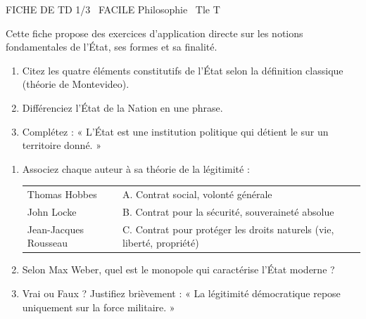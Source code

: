 \documentclass[11pt]{article}
\begin{document}
\begin{tcolorbox}[enhanced,colback=popink,colframe=popink,arc=10pt,boxrule=0pt,left=12pt,right=12pt,top=9pt,bottom=9pt]
{\color{white}\popxbold\small FICHE DE TD 1/3 \textbullet\ FACILE \hfill Philosophie \textbullet\ Tle T\par}
\end{tcolorbox}
\vspace{4pt}
Cette fiche propose des exercices d'application directe sur les notions fondamentales de l'État, ses formes et sa finalité.

\begin{exercice}
\begin{enumerate}
    \item Citez les quatre éléments constitutifs de l'État selon la définition classique (théorie de Montevideo).
    \item Différenciez l'État de la Nation en une phrase.
    \item Complétez : « L'État est une institution politique qui détient le \underline{\hspace{4cm}} sur un territoire donné. »
\end{enumerate}
\end{exercice}

\begin{exercice}
\begin{enumerate}
    \item Associez chaque auteur à sa théorie de la légitimité :
    \begin{tabular}{ll}
        Thomas Hobbes & \quad A. Contrat social, volonté générale \\
        John Locke  & \quad B. Contrat pour la sécurité, souveraineté absolue \\
        Jean-Jacques Rousseau & \quad C. Contrat pour protéger les droits naturels (vie, liberté, propriété)
    \end{tabular}
    \item Selon Max Weber, quel est le monopole qui caractérise l'État moderne ?
    \item Vrai ou Faux ? Justifiez brièvement : « La légitimité démocratique repose uniquement sur la force militaire. »
\end{enumerate}
\end{exercice}
\end{document}
